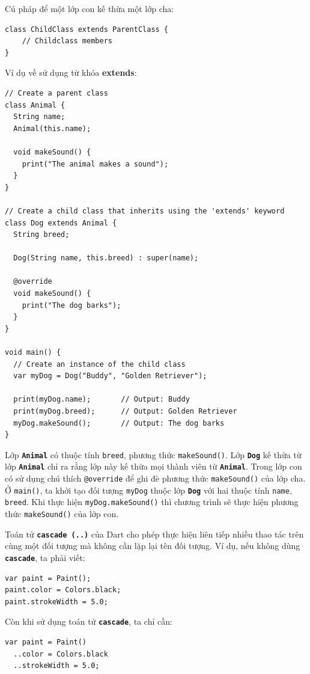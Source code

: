 \documentclass[../DoAn.tex]{subfiles}
\numberwithin{figure}{chapter}
\begin{document}
Cú pháp để một lớp con kế thừa một lớp cha:
\begin{lstlisting}
class ChildClass extends ParentClass {
    // Childclass members
}
\end{lstlisting}

Ví dụ về sử dụng từ khóa \textbf{extends}: 
\begin{lstlisting}
// Create a parent class
class Animal {
  String name;
  Animal(this.name);

  void makeSound() {
    print("The animal makes a sound");
  }
}

// Create a child class that inherits using the 'extends' keyword
class Dog extends Animal {
  String breed;

  Dog(String name, this.breed) : super(name);

  @override
  void makeSound() {
    print("The dog barks");
  }
}

void main() {
  // Create an instance of the child class
  var myDog = Dog("Buddy", "Golden Retriever");

  print(myDog.name);       // Output: Buddy
  print(myDog.breed);      // Output: Golden Retriever
  myDog.makeSound();       // Output: The dog barks
}
\end{lstlisting}

Lớp \textbf{\texttt{Animal}} có thuộc tính \texttt{breed}, phương thức \texttt{makeSound()}. Lớp \textbf{\texttt{Dog}} kế thừa từ lớp \textbf{\texttt{Animal}} chỉ ra rằng lớp này kế thừa mọi thành viên từ \textbf{\texttt{Animal}}. Trong lớp con có sử dụng chú thích \texttt{@override} để ghi đè phương thức \texttt{makeSound()} của lớp cha. Ở \texttt{main()}, ta khởi tạo đối tượng \texttt{myDog} thuộc lớp \textbf{\texttt{Dog}} với hai thuộc tính \texttt{name}, \texttt{breed}. Khi thực hiện \texttt{myDog.makeSound()} thì chương trình sẽ thực hiện phương thức \texttt{makeSound()} của lớp con.

Toán tử \textbf{\texttt{cascade (..)}} của Dart cho phép thực hiện liên tiếp nhiều thao tác trên cùng một đối tượng mà không cần lặp lại tên đối tượng. Ví dụ, nếu không dùng \textbf{\texttt{cascade}}, ta phải viết:
\begin{lstlisting}
var paint = Paint();
paint.color = Colors.black;
paint.strokeWidth = 5.0;
\end{lstlisting}

Còn khi sử dụng toán tử \textbf{\texttt{cascade}}, ta chỉ cần:
\begin{lstlisting}
var paint = Paint()
  ..color = Colors.black
  ..strokeWidth = 5.0;
\end{lstlisting}
\end{document}
